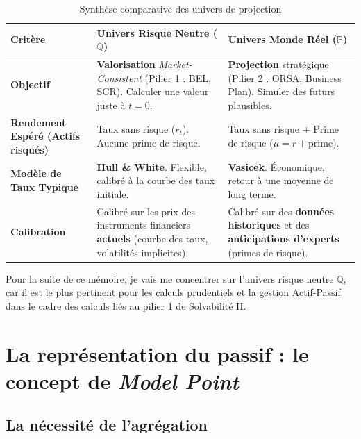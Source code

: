 \begin{table}[H]
    \centering
    \caption{Synthèse comparative des univers de projection}
    \label{tab:univers_s2_comp}
    \begin{tabularx}{\textwidth}{l >{\raggedright\arraybackslash}X >{\raggedright\arraybackslash}X}
        \toprule
        \textbf{Critère} & \textbf{\texorpdfstring{Univers Risque Neutre ($\mathbb{Q}$)}{Univers Risque Neutre (Q)}} & \textbf{\texorpdfstring{Univers Monde Réel ($\mathbb{P}$)}{Univers Monde Réel (P)}} \\
        \midrule
        \textbf{Objectif}
        &
        \textbf{Valorisation} \textit{Market-Consistent} (Pilier 1 : BEL, SCR). Calculer une valeur juste à $t=0$.
        &
        \textbf{Projection} stratégique (Pilier 2 : ORSA, Business Plan). Simuler des futurs plausibles. \\
        \addlinespace
        \textbf{Rendement Espéré (Actifs risqués)}
        &
        Taux sans risque ($r_t$). Aucune prime de risque.
        &
        Taux sans risque + Prime de risque ($\mu = r + \text{prime}$). \\
        \addlinespace
        \textbf{Modèle de Taux Typique}
        &
        \textbf{Hull \& White}. Flexible, calibré à la courbe des taux initiale.
        &
        \textbf{Vasicek}. Économique, retour à une moyenne de long terme. \\
        \addlinespace
        \textbf{Calibration}
        &
        Calibré sur les prix des instruments financiers \textbf{actuels} (courbe des taux, volatilités implicites).
        &
        Calibré sur des \textbf{données historiques} et des \textbf{anticipations d'experts} (primes de risque). \\
        \bottomrule
    \end{tabularx}
\end{table}

Pour la suite de ce mémoire, je vais me concentrer sur l'univers risque neutre $\mathbb{Q}$, car il est le plus pertinent pour les calculs prudentiels et la gestion Actif-Passif dans le cadre des calculs liés au pilier 1 de Solvabilité II.


\section{La représentation du passif : le concept de \textit{Model Point}}
\label{sec:mp}

\subsection{La nécessité de l'agrégation}

